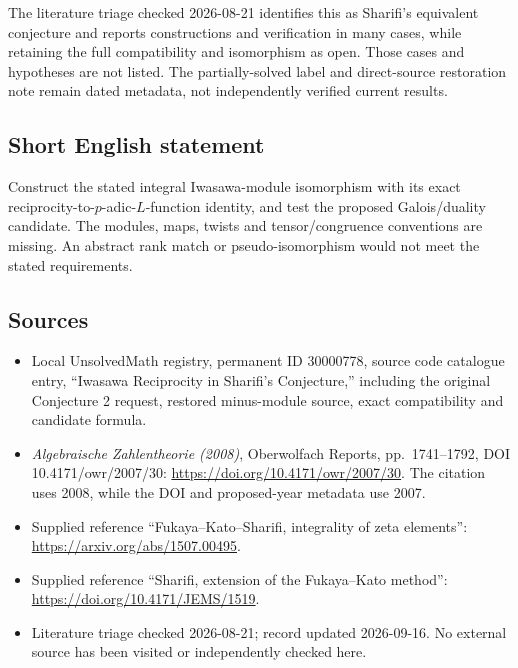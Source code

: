 \documentclass[11pt]{article}
\begin{document}
The literature triage checked 2026-08-21 identifies this as Sharifi's equivalent conjecture and reports constructions and verification in many cases, while retaining the full compatibility and isomorphism as open. Those cases and hypotheses are not listed. The partially-solved label and direct-source restoration note remain dated metadata, not independently verified current results.
\subsection{Short English statement}
Construct the stated integral Iwasawa-module isomorphism with its exact reciprocity-to-\(p\)-adic-\(L\)-function identity, and test the proposed Galois/duality candidate. The modules, maps, twists and tensor/congruence conventions are missing. An abstract rank match or pseudo-isomorphism would not meet the stated requirements.
\subsection{Sources}
\begin{itemize}
\item Local UnsolvedMath registry, permanent ID 30000778, source code catalogue entry, ``Iwasawa Reciprocity in Sharifi's Conjecture,'' including the original Conjecture 2 request, restored minus-module source, exact compatibility and candidate formula.
\item \emph{Algebraische Zahlentheorie (2008)}, Oberwolfach Reports, pp.\ 1741--1792, DOI 10.4171/owr/2007/30: \url{https://doi.org/10.4171/owr/2007/30}. The citation uses 2008, while the DOI and proposed-year metadata use 2007.
\item Supplied reference ``Fukaya--Kato--Sharifi, integrality of zeta elements'': \url{https://arxiv.org/abs/1507.00495}.
\item Supplied reference ``Sharifi, extension of the Fukaya--Kato method'': \url{https://doi.org/10.4171/JEMS/1519}.
\item Literature triage checked 2026-08-21; record updated 2026-09-16. No external source has been visited or independently checked here.
\end{itemize}
\end{document}
